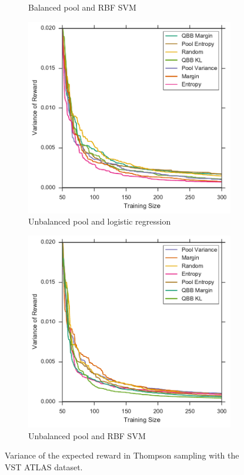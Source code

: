 \begin{figure}[p]
\begin{subfigure}{.5\textwidth}
		\caption{Balanced pool and RBF SVM}
		\label{fig:vstatlas_br_sigmas}
	\end{subfigure}
	\begin{subfigure}{.5\textwidth}
		\centering
		\includegraphics[width=\textwidth]{figures/5_thompson/vstatlas_ul_sigmas}
		\caption{Unbalanced pool and logistic regression}
		\label{fig:vstatlas_ul_sigmas}
	\end{subfigure}%
	\begin{subfigure}{.5\textwidth}
		\centering
		\includegraphics[width=\linewidth]{figures/5_thompson/vstatlas_ur_sigmas}
		\caption{Unbalanced pool and RBF SVM}
		\label{fig:vstatlas_ur_sigmas}
	\end{subfigure}
	\caption[Variance of heuristics (VST ATLAS)]{
		Variance of the expected reward in Thompson sampling with the VST ATLAS dataset.}
	\label{fig:vstatlas_sigmas}
\end{figure}


